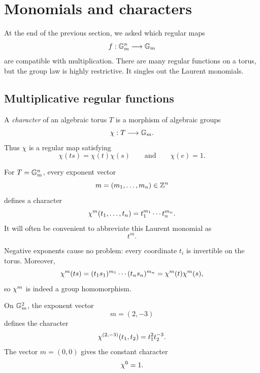 \section{Monomials and characters}
\label{sec:monomials-characters}

At the end of the previous section, we asked which regular maps
\[
f:\mathbb{G}_{m}^n\longrightarrow\mathbb{G}_{m}
\]
are compatible with multiplication. There are many regular functions
on a torus, but the group law is highly restrictive. It singles out
the Laurent monomials.

\subsection{Multiplicative regular functions}

\begin{definition}
A \emph{character} of an algebraic torus \(T\) is a morphism of
algebraic groups
\[
\chi:T\longrightarrow\mathbb{G}_{m}.
\]
Thus \(\chi\) is a regular map satisfying
\[
\chi(ts)=\chi(t)\chi(s)
\qquad
\text{and}
\qquad
\chi(e)=1.
\]
\end{definition}

For \(T=\mathbb{G}_{m}^n\), every exponent vector
\[
m=(m_1,\ldots,m_n)\in\mathbb{Z}^n
\]
defines a character
\[
\chi^{m}(t_1,\ldots,t_n)
=
t_1^{m_1}\cdots t_n^{m_n}.
\]
It will often be convenient to abbreviate this Laurent monomial as
\[
t^m.
\]

Negative exponents cause no problem: every coordinate \(t_i\) is
invertible on the torus. Moreover,
\[
\chi^{m}(ts)
=
(t_1s_1)^{m_1}\cdots(t_ns_n)^{m_n}
=
\chi^{m}(t)\chi^{m}(s),
\]
so \(\chi^{m}\) is indeed a group homomorphism.

\begin{example}
On \(\mathbb{G}_{m}^2\), the exponent vector
\[
m=(2,-3)
\]
defines the character
\[
\chi^{(2,-3)}(t_1,t_2)
=
t_1^2t_2^{-3}.
\]
The vector \(m=(0,0)\) gives the constant character
\[
\chi^{0}=1.
\]
\end{example}

